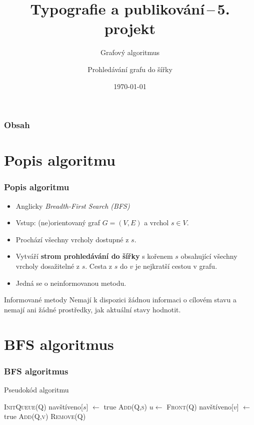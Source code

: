 \documentclass{beamer}
\title{Typografie a publikování\,--\,5. projekt}
\subtitle{Grafový algoritmus}
\author{Prohledávání grafu do šířky}
\date{\today}
\begin{document}
\frame{\titlepage}

\begin{frame}
    \frametitle{Obsah}
    \tableofcontents
\end{frame}

\section{Popis algoritmu}
\begin{frame}\frametitle{Popis algoritmu}
    \begin{itemize}
        \item Anglicky \emph{Breadth-First Search (BFS)}
        \item Vstup: (ne)orientovaný graf $G = (V, E)$ a vrchol $s \in V$.
        \item Prochází všechny vrcholy dostupné z $s$.
        \item Vytváří \textbf{strom prohledávání do šířky} s kořenem $s$ obsahující všechny vrcholy dosažitelné z $s$. Cesta z $s$ do $v$ je nejkratší cestou v grafu.
        \item Jedná se o neinformovanou metodu.
    \end{itemize}
    \begin{block}{Informované metody}
        Nemají k dispozici žádnou informaci o cílovém stavu a nemají ani žádné prostředky, jak aktuální stavy hodnotit.
    \end{block}
\end{frame}

\section{BFS algoritmus}
\begin{frame} \frametitle{BFS algoritmus}
    \begin{block}{Pseudokód algoritmu}
        \small
        \begin{algorithmic}[0]
            \State \textsc{InitQueue(Q)}
            \State navštíveno[$s$] $\gets$ true
            \State \textsc{Add(Q,s)}
                \State $u \gets$ \textsc{Front(Q)}
                        \State navštíveno[$v$] $\gets$ true
                        \State \textsc{Add(Q,v)}
                    \EndIf
                \EndFor
                \State \textsc{Remove(Q)}
            \EndWhile
            \EndProcedure
        \end{algorithmic}
    \end{block}
\end{frame}
\end{document}
